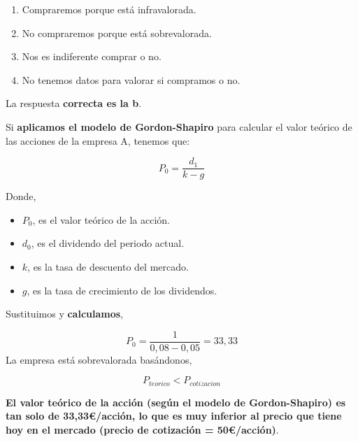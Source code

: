 \documentclass[
  letterpaper,
  DIV=11,
  numbers=noendperiod]{scrreprt}
\begin{document}
\begin{enumerate}
\def\labelenumi{\alph{enumi}.}
\item
  Compraremos porque está infravalorada.
\item
  No compraremos porque está sobrevalorada.
\item
  Nos es indiferente comprar o no.
\item
  No tenemos datos para valorar si compramos o no.
\end{enumerate}

\begin{tcolorbox}[enhanced jigsaw, left=2mm, opacityback=0, colback=white, breakable, arc=.35mm, bottomrule=.15mm, rightrule=.15mm, toprule=.15mm, leftrule=.75mm, colframe=quarto-callout-tip-color-frame]
\begin{minipage}[t]{5.5mm}
\textcolor{quarto-callout-tip-color}{\faLightbulb}
\end{minipage}%
\begin{minipage}[t]{\textwidth - 5.5mm}

La respuesta \textbf{correcta es la b}.

Si \textbf{aplicamos el modelo de Gordon-Shapiro} para calcular el valor
teórico de las acciones de la empresa A, tenemos que:

\[P_0=\frac{d_1}{k-g}\]

Donde,

\begin{itemize}
\item
  \(P_0\), es el valor teórico de la acción.
\item
  \(d_0\), es el dividendo del periodo actual.
\item
  \(k\), es la tasa de descuento del mercado.
\item
  \(g\), es la tasa de crecimiento de los dividendos.
\end{itemize}

Sustituimos y \textbf{calculamos},

\[P_0=\frac{1}{0,08-0,05}=33,33\] La empresa está sobrevalorada
basándonos,

\[P_{teorico}<P_{cotizacion}\]

\textbf{El valor teórico de la acción (según el modelo de
Gordon-Shapiro) es tan solo de 33,33€/acción, lo que es muy inferior al
precio que tiene hoy en el mercado (precio de cotización = 50€/acción)}.

\end{minipage}%
\end{tcolorbox}
\end{document}
